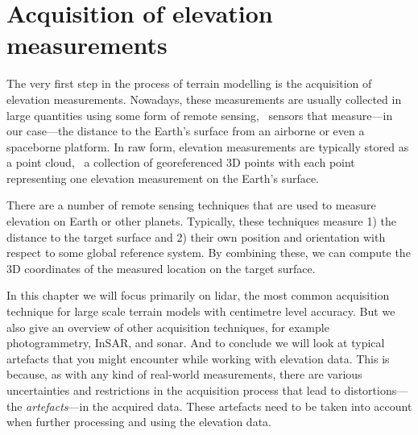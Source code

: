 

\setchapterpreamble[u]{\margintoc}

\graphicspath{{acquisition/}}


\chapter{Acquisition of elevation measurements}%
\label{chap:acquisition}

The very first step in the process of terrain modelling is the acquisition of elevation measurements. 
Nowadays, these measurements are usually collected in large quantities using some form of remote sensing, \ie\ sensors that measure---in our case---the distance to the Earth's surface from an airborne or even a spaceborne platform. 
In raw form, elevation measurements are typically stored as a point cloud, \ie\ a collection of georeferenced 3D points with each point representing one elevation measurement on the Earth's surface.

There are a number of remote sensing techniques that are used to measure elevation on Earth or other planets. 
Typically, these techniques measure 1) the distance to the target surface and 2) their own position and orientation with respect to some global reference system. 
By combining these, we can compute the 3D coordinates of the measured location on the target surface. 

In this chapter we will focus primarily on lidar, the most common acquisition technique for large scale terrain models with centimetre level accuracy. 
But we also give an overview of other acquisition techniques, for example photogrammetry, InSAR, and sonar. 
And to conclude we will look at typical artefacts that you might encounter while working with elevation data. 
This is because, as with any kind of real-world measurements, there are various uncertainties and restrictions in the acquisition process that lead to distortions---the \emph{artefacts}---in the acquired data. These artefacts need to be taken into account when further processing and using the elevation data. 

